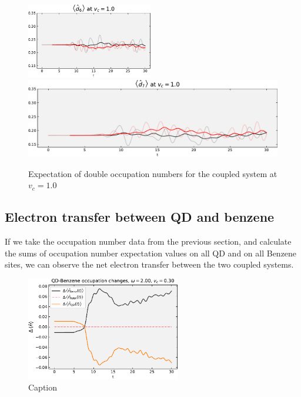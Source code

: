 \begin{figure}[!hbt]
\begin{minipage}[b]{.49\textwidth}
                \includegraphics[width=0.49\textwidth]{graph/double_occupation/double_occupation_vc_10_site_6.pdf}
                \includegraphics[width=1.00\textwidth]{graph/double_occupation/double_occupation_vc_10_site_7.pdf}
       \caption{Expectation of double occupation numbers for the coupled system at $v_c = 1.0$}
        \label{fig:double_occupatino_vc_10}
    \end{minipage}
\end{figure}

\subsection{Electron transfer between QD and benzene}
If we take the occupation number data from the previous section, and calculate the sums of occupation number expectation values on all QD and on all Benzene sites, we can observe the net electron transfer between the two coupled systems.

\begin{figure}[!hbt]
    \centering
    \includegraphics[width=0.6\textwidth]{graph/occupation/occupation_w2_03_sum.pdf}
    \caption{Caption}
    \label{fig:occupation_sum_w_2_vc_03}
\end{figure}

